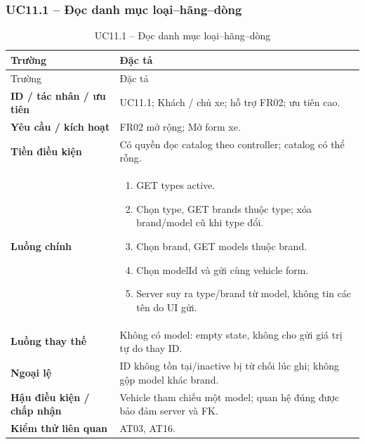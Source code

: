 \subsubsection{UC11.1 -- Đọc danh mục loại--hãng--dòng}\label{uc:UC11.1}
\begin{smalltable}\begin{longtable}{L{3.2cm}L{11.8cm}}
\caption{UC11.1 -- Đọc danh mục loại--hãng--dòng}\label{tab:UC11.1}\\
\toprule Trường & Đặc tả\\\midrule\endfirsthead
\toprule Trường & Đặc tả\\\midrule\endhead
\textbf{ID / tác nhân / ưu tiên} & UC11.1; Khách / chủ xe; hỗ trợ FR02; ưu tiên cao.\\
\textbf{Yêu cầu / kích hoạt} & FR02 mở rộng; Mở form xe.\\
\textbf{Tiền điều kiện} & Có quyền đọc catalog theo controller; catalog có thể rỗng.\\
\textbf{Luồng chính} & \begin{enumerate}[leftmargin=*,nosep]
\item GET types active.
\item Chọn type, GET brands thuộc type; xóa brand/model cũ khi type đổi.
\item Chọn brand, GET models thuộc brand.
\item Chọn modelId và gửi cùng vehicle form.
\item Server suy ra type/brand từ model, không tin các tên do UI gửi.
\end{enumerate}\\
\textbf{Luồng thay thế} & Không có model: empty state, không cho gửi giá trị tự do thay ID.\\
\textbf{Ngoại lệ} & ID không tồn tại/inactive bị từ chối lúc ghi; không gộp model khác brand.\\
\textbf{Hậu điều kiện / chấp nhận} & Vehicle tham chiếu một model; quan hệ đúng được bảo đảm server và FK.\\
\textbf{Kiểm thử liên quan} & AT03, AT16.\\
\bottomrule\end{longtable}\end{smalltable}
